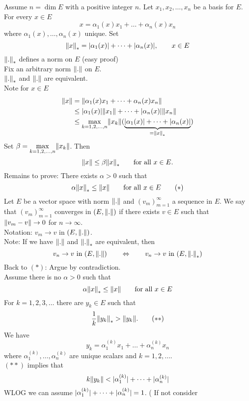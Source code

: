 \begin{beweis}
	Assume $n = \dim E$ with a positive integer $n$. Let $x_1,x_2, \dots , x_n$ be a basis for $E$. For every $x \in E$
	\[
		x = \alpha_1(x)x_1 + \dots + \alpha_n(x)x_n
	\]
	where $\alpha_1(x), \dots, \alpha_n(x)$ unique. Set 
	\[
		\norm{x}_{*} = \abs{\alpha_1(x)}+ \dots + \abs{\alpha_n(x)}, \qquad x \in E
	\]
	$\norm{.}_{*}$ defines a norm on $E$ (easy proof) \\
	Fix an arbitrary norm $\norm{.}$ on $E$. \\
	$\norm{.}_{*}$ and $\norm{.}$ are equivalent. \\
	Note for $x \in E$
	\begin{align*}
		\norm{x} &= \norm{\alpha_1(x)x_1 + \dots + \alpha_n(x)x_n}  \\
		&\leq \abs{\alpha_1(x)}\norm{x_1} + \dots + \abs{\alpha_n(x)} \norm{x_n} \\
		&\leq \max\limits_{k=1,2,\dots,n} \norm{x_k} ( \underset{= \norm{x}_{*}}{\underbrace{\abs{\alpha_1(x)}+ \dots + \abs{\alpha_n(x)}}}) 
	\end{align*}
	Set $\beta = \max\limits_{k=1,2,\dots,n} \norm{x_k}$.
	Then
	\[
		\norm{x} \leq \beta \norm{x}_{*} \qquad \text{for all }x \in E.
	\]
	Remains to prove: There exists $\alpha >0$ such that
	\[
		\alpha \norm{x}_{*} \leq \norm{x} \qquad \text{for all } x \in E \qquad (*)
	\]
	Let $E$ be a vector space with norm $\norm{.}$ and $(v_m)_{m=1}^{\infty}$ a sequence in $E$. We say that $(v_m)_{m=1}^{\infty}$ converges in $(E,\norm{.})$ if there exists $v \in E$ such that $\norm{v_m-v} \to 0$ for $n \to \infty$. \\
	Notation: $v_m \to v$ in $(E, \norm{.})$. \\
	Note: If we have $\norm{.}$ and $\norm{.}_{*}$ are equivalent, then
	\[
		v_n \to v \text{ in }(E,\norm{.}) \qquad  \Leftrightarrow \qquad v_n \to v \text{ in }(E,\norm{.}_{*})
	\] 
	Back to $(*)$: Argue by contradiction. \\
	Assume there is no $\alpha >0$ such that
	\[
		\alpha \norm{x}_{*} \leq \norm{x} \qquad \text{for all } x \in E
	\]
	For $k=1,2,3,\dots$ there are $y_k \in E$ such that
	\[
		\frac{1}{k}\norm{y_k}_{*} > \norm{y_k}. \qquad (**)
	\]
	We have 
	\[
		y_k = \alpha_1^{(k)} x_1 + \dots + \alpha_n^{(k)} x_n
	\]
	where $\alpha_1^{(k)}, \dots, \alpha_n^{(k)}$ are unique scalars and $k = 1,2, \dots$. \\
	$(**)$ implies that
	\[
		k \norm{y_k} < \abs{\alpha_1^{(k)}} + \dots + \abs{\alpha_n^{(k)}}
	\]
	WLOG we can assume $\lvert\alpha_1^{(k)}\rvert+ \dots + \lvert\alpha_n^{(k)}\rvert = 1$. ( If not consider 

\end{beweis}

